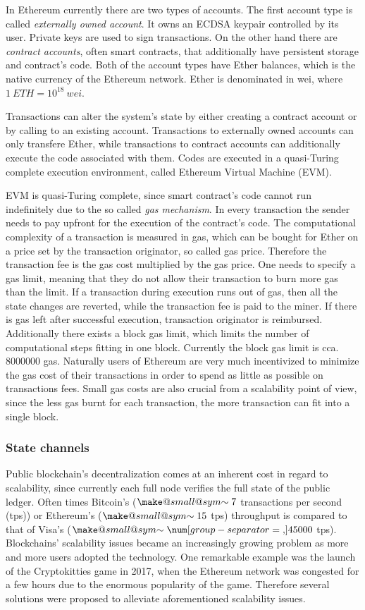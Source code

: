 \documentclass[a4paper,UKenglish,cleveref, autoref]{oasics-v2019}
\makeatletter
\newcommand{\smallsim}{\smallsym{\mathrel}{\sim}}
\newcommand{\smallsym}[2]{#1{\mathpalette\make@small@sym{#2}}}
\newcommand{\make@small@sym}[2]{%
	\vcenter{\hbox{$\m@th\downgrade@style#1#2$}}%
}
\newcommand{\downgrade@style}[1]{%
	\ifx#1\displaystyle\scriptstyle\else
	\ifx#1\textstyle\scriptstyle\else
	\scriptscriptstyle
	\fi\fi
}
\makeatother
\begin{document}
In Ethereum currently there are two types of accounts. The first account type is called \textit{externally owned account}. It owns an ECDSA keypair controlled by its user. Private keys are used to sign transactions. On the other hand there are \textit{contract accounts}, often smart contracts, that additionally have persistent storage and contract's code. Both of the account types have Ether balances, which is the native currency of the Ethereum network. Ether is denominated in wei, where $1\ ETH = 10^ {18}\ wei$.

Transactions can alter the system's state by either creating a contract account or by calling to an existing account. Transactions to externally owned accounts can only transfere Ether, while transactions to contract accounts can additionally execute the code associated with them. Codes are executed in a quasi-Turing complete execution environment, called Ethereum Virtual Machine (EVM).

EVM is quasi-Turing complete, since smart contract's code cannot run indefinitely due to the so called \textit{gas mechanism}. In every transaction the sender needs to pay upfront for the execution of the contract's code. The computational complexity of a transaction is measured in gas, which can be bought for Ether on a price set by the transaction originator, so called gas price. Therefore the transaction fee is the gas cost multiplied by the gas price. One needs to specify a gas limit, meaning that they do not allow their transaction to burn more gas than the limit. If a transaction during execution runs out of gas, then all the state changes are reverted, while the transaction fee is paid to the miner. If there is gas left after successful execution, transaction originator is reimbursed. Additionally there exists a block gas limit, which limits the number of computational steps fitting in one block. Currently the block gas limit is cca. $\num[group-separator={,}]{8000000}$ gas. Naturally users of Ethereum are very much incentivized to minimize the gas cost of their transactions in order to spend as little as possible on transactions fees. Small gas costs are also crucial from a scalability point of view, since the less gas burnt for each transaction, the more transaction can fit into a single block.   

\subsubsection{State channels} 
Public blockchain's decentralization comes at an inherent cost in regard to scalability, since currently each full node verifies the full state of the public ledger. Often times Bitcoin's ($\smallsim7$ transactions per second (tps)) or Ethereum's ($\smallsim15$ tps) throughput is compared to that of Visa's ($\smallsim\num[group-separator={,}]{45000}$ tps). Blockchains' scalability issues became an increasingly growing problem as more and more users adopted the technology. One remarkable example was the launch of the Cryptokitties game in 2017, when the Ethereum network was congested for a few hours due to the enormous popularity of the game. Therefore several solutions were proposed to alleviate aforementioned scalability issues.
\end{document}
